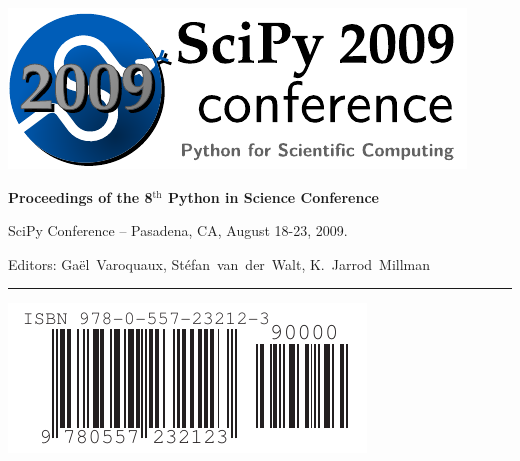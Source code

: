 
\cleardoublepage

\pagestyle{empty}

\begin{minipage}{.4\linewidth}
\includegraphics[width=\linewidth]{scipy2009confs}
\end{minipage}
\hfill
\begin{minipage}{.6\linewidth}
{\bfseries\sffamily 
Proceedings of the 8$^{\text{th}}$ Python in Science Conference}

SciPy Conference -- Pasadena, CA, August 18-23, 2009. 

Editors: \quad \mbox{Ga\"el {\sc Varoquaux}},  \quad 
\mbox{St\'efan {\sc van der Walt}}, \quad \mbox{K. Jarrod {\sc Millman}}

\end{minipage}

\hrule

\vbox{}
\vfill
\vfill
\hfill\includegraphics[width=.3\linewidth]{isbn_barcode}




